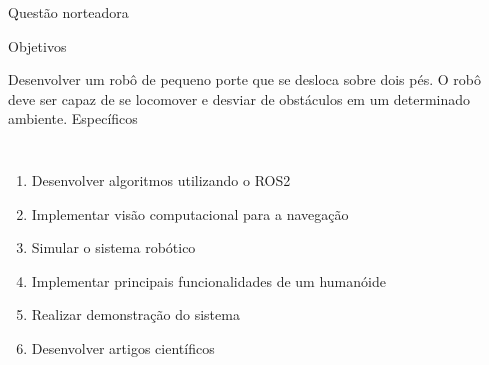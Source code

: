 \begin{frame}[c]{Questão norteadora} 
    \transdissolve[duration=0.5]
   
    \begin{center}
    \end{center}
    
   
\end{frame}
\begin{frame}[t]{Objetivos} 
    \transdissolve[duration=0.5]
    
        Desenvolver um robô de pequeno porte que se desloca sobre dois pés. O robô deve ser capaz de se locomover e desviar de obstáculos em um determinado ambiente.
        \newline
        \newline
         Específicos
        \begin{columns}[t]
                \begin{enumerate}
                    \item Desenvolver algoritmos utilizando o ROS2
                    \item Implementar visão computacional para a navegação
                    \item Simular o sistema robótico
                    \item Implementar principais funcionalidades de um humanóide
                    \item Realizar demonstração do sistema
                    \item Desenvolver artigos científicos
                \end{enumerate}
        \end{columns}
\end{frame}
